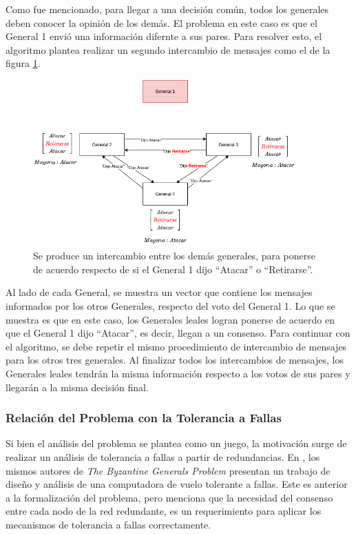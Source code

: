 Como fue mencionado, para llegar a una decisión común, todos los generales deben conocer la opinión de los demás. El problema en este caso es que el General 1 envió una información difernte a sus pares. Para resolver esto, el algoritmo plantea realizar un segundo intercambio de mensajes como el de la figura \ref{fig:Byzantine_Generals_Problem_3}.

\begin{figure}[H]
    \centering
    \includegraphics[width=0.9\textwidth]{img/Byzantine_Generals_Problem_3.png}
    \caption{Se produce un intercambio entre los demás generales, para ponerse de acuerdo respecto de si el General 1 dijo ``Atacar'' o ``Retirarse''.}
    \label{fig:Byzantine_Generals_Problem_3}
\end{figure}

Al lado de cada General, se muestra un vector que contiene los mensajes informados por los otros Generales, respecto del voto del General 1. Lo que se muestra es que en este caso, los Generales leales logran ponerse de acuerdo en que el General 1 dijo ``Atacar'', es decir, llegan a un consenso. Para continuar con el algoritmo, se debe repetir el mismo procedimiento de intercambio de mensajes para los otros tres generales. Al finalizar todos los intercambios de mensajes, los Generales leales tendrán la misma información respecto a los votos de sus pares y llegarán a la misma decisión final.

\subsubsection{Relación del Problema con la Tolerancia a Fallas}

Si bien el análisis del problema se plantea como un juego, la motivación surge de realizar un análisis de tolerancia a fallas a partir de redundancias. En \cite{wensley1978sift}, los mismos autores de \textit{The Byzantine Generals Problem} presentan un trabajo de diseño y análisis de una computadora de vuelo tolerante a fallas. Este es anterior a la formalización del problema, pero menciona que la necesidad del consenso entre cada nodo de la red redundante, es un requerimiento para aplicar los mecanismos de tolerancia a fallas correctamente.

